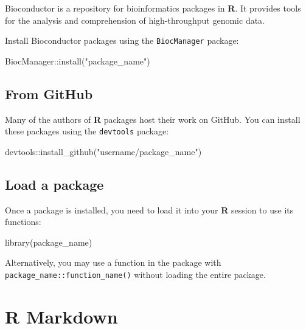 \documentclass[
  letterpaper,
  DIV=11,
  numbers=noendperiod]{scrreprt}
\newenvironment{Shaded}{\begin{snugshade}}{\end{snugshade}}
\newcommand{\FunctionTok}[1]{\textcolor[rgb]{0.28,0.35,0.67}{#1}}
\newcommand{\NormalTok}[1]{\textcolor[rgb]{0.00,0.23,0.31}{#1}}
\newcommand{\SpecialCharTok}[1]{\textcolor[rgb]{0.37,0.37,0.37}{#1}}
\newcommand{\StringTok}[1]{\textcolor[rgb]{0.13,0.47,0.30}{#1}}
\begin{document}
Bioconductor is a repository for bioinformatics packages in \textbf{R}.
It provides tools for the analysis and comprehension of high-throughput
genomic data.

Install Bioconductor packages using the \texttt{BiocManager} package:

\begin{Shaded}
\begin{Highlighting}[]
\NormalTok{BiocManager}\SpecialCharTok{::}\FunctionTok{install}\NormalTok{(}\StringTok{"package\_name"}\NormalTok{)}
\end{Highlighting}
\end{Shaded}

\subsection{From GitHub}\label{from-github}

Many of the authors of \textbf{R} packages host their work on GitHub.
You can install these packages using the \texttt{devtools} package:

\begin{Shaded}
\begin{Highlighting}[]
\NormalTok{devtools}\SpecialCharTok{::}\FunctionTok{install\_github}\NormalTok{(}\StringTok{"username/package\_name"}\NormalTok{)}
\end{Highlighting}
\end{Shaded}

\subsection{Load a package}\label{load-a-package}

Once a package is installed, you need to load it into your \textbf{R}
session to use its functions:

\begin{Shaded}
\begin{Highlighting}[]
\FunctionTok{library}\NormalTok{(package\_name)}
\end{Highlighting}
\end{Shaded}

Alternatively, you may use a function in the package with
\texttt{package\_name::function\_name()} without loading the entire
package.

\section{R Markdown}\label{r-markdown}
\end{document}
